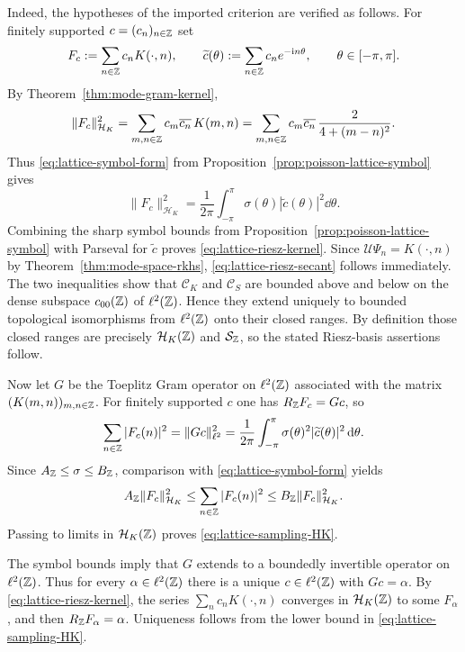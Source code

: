 Indeed, the hypotheses of the imported criterion are verified as follows.
For finitely supported $c=(c_n)_{n\in\mathbb{Z}}$ set
\[
F_c:=\sum_{n\in\mathbb{Z}}c_nK(\cdot,n),
\qquad
\widetilde c(\theta):=\sum_{n\in\mathbb{Z}}c_ne^{-\mathrm{i} n\theta},
\qquad
\theta\in[-\pi,\pi].
\]
By Theorem~\ref{thm:mode-gram-kernel},
\[
\|F_c\|_{\mathcal H_K}^2
=\sum_{m,n\in\mathbb{Z}}c_m\overline{c_n}\,K(m,n)
=\sum_{m,n\in\mathbb{Z}}c_m\overline{c_n}\,\frac{2}{4+(m-n)^2}.
\]
Thus \eqref{eq:lattice-symbol-form} from
Proposition~\ref{prop:poisson-lattice-symbol} gives
\[
\|F_c\|_{\mathcal H_K}^2
=\frac{1}{2\pi}\int_{-\pi}^{\pi}\sigma(\theta)
|\widetilde c(\theta)|^2\dd\theta.
\]
Combining the sharp symbol bounds from
Proposition~\ref{prop:poisson-lattice-symbol} with Parseval for
$\widetilde c$ proves \eqref{eq:lattice-riesz-kernel}.  Since
$\mathcal U\Psi_n=K(\cdot,n)$ by
Theorem~\ref{thm:mode-space-rkhs}, \eqref{eq:lattice-riesz-secant}
follows immediately.
The two inequalities show that $\mathcal C_K$ and $\mathcal C_S$
are bounded above and below on the dense subspace $c_{00}(\mathbb{Z})$ of
$\ell^2(\mathbb{Z})$.  Hence they extend uniquely to bounded topological
isomorphisms from $\ell^2(\mathbb{Z})$ onto their closed ranges.  By definition
those closed ranges are precisely $\mathcal H_K(\mathbb{Z})$ and
$\mathcal S_{\mathbb{Z}}$, so the stated Riesz-basis assertions follow.

Now let $G$ be the Toeplitz Gram operator on $\ell^2(\mathbb{Z})$ associated
with the matrix $(K(m,n))_{m,n\in\mathbb{Z}}$.  For finitely supported $c$ one
has $R_{\mathbb{Z}}F_c=Gc$, so
\[
\sum_{n\in\mathbb{Z}}|F_c(n)|^2
=\|Gc\|_{\ell^2}^2
=\frac{1}{2\pi}\int_{-\pi}^{\pi}\sigma(\theta)^2
|\widetilde c(\theta)|^2\,\mathrm{d}\theta.
\]
Since $A_{\mathbb{Z}}\le \sigma\le B_{\mathbb{Z}}$, comparison with
\eqref{eq:lattice-symbol-form} yields
\[
A_{\mathbb{Z}}\|F_c\|_{\mathcal H_K}^2
\le
\sum_{n\in\mathbb{Z}}|F_c(n)|^2
\le
B_{\mathbb{Z}}\|F_c\|_{\mathcal H_K}^2.
\]
Passing to limits in $\mathcal H_K(\mathbb{Z})$ proves
\eqref{eq:lattice-sampling-HK}.

The symbol bounds imply that $G$ extends to a boundedly invertible
operator on $\ell^2(\mathbb{Z})$.  Thus for every $\alpha\in\ell^2(\mathbb{Z})$ there is
a unique $c\in\ell^2(\mathbb{Z})$ with $Gc=\alpha$.  By
\eqref{eq:lattice-riesz-kernel}, the series $\sum_n c_nK(\cdot,n)$
converges in $\mathcal H_K(\mathbb{Z})$ to some $F_\alpha$, and then
$R_{\mathbb{Z}}F_\alpha=\alpha$.  Uniqueness follows from the lower bound in
\eqref{eq:lattice-sampling-HK}.

